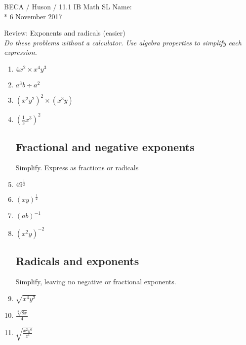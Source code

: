 \documentclass[]{book}
\begin{document}
\noindent BECA / Huson / 11.1 IB Math SL \hspace{2in} Name:\\*
6 November 2017
\begin{center}
{\Large Review: Exponents and radicals (easier)}\\
\textit{Do these problems without a calculator. Use algebra properties to simplify each expression.}
\end{center}

\begin{enumerate}

\subsection*{Exponent rules}

\item $\displaystyle 4x^{2} \times x^4 y^3$\\[10pt]
\item $a^3 b \div a^{2}$\\[10pt]
\item $(x^2 y^2)^2 \times (x^3 y)$\\[10pt]
\item $\displaystyle (\frac{1}{2} x^3)^2$\\[10pt]

\subsection*{Fractional and negative exponents}
Simplify. Express as fractions or radicals

\item $\displaystyle  49^\frac{1}{2}$\\[10pt]
\item $\displaystyle  (xy)^\frac{1}{2}$\\[10pt]
\item $\displaystyle  (ab)^{-1}$\\[10pt]
\item $\displaystyle  (x^2 y)^{-2}$\\[10pt]

\subsection*{Radicals and exponents}
Simplify, leaving no negative or fractional exponents.

\item $\sqrt{x^4 y^2}$\\[10pt]
\item $\displaystyle  \frac{\sqrt[3]{8x}}{4}$\\[10pt]
\item $\displaystyle  \sqrt{\frac{x^2 y^{6}}{z^{4}}}$\\[10pt]
\end{enumerate}
\end{document}

